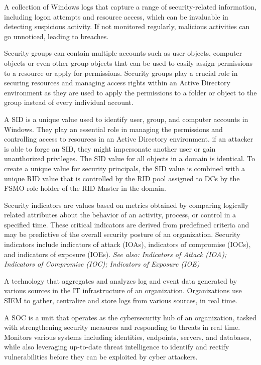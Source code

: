  A collection of Windows logs that capture a range of security-related information, including logon attempts and resource access, which can be invaluable in detecting suspicious activity. If not monitored regularly, malicious activities can go unnoticed, leading to breaches.

 Security groups can contain multiple accounts such as user objects, computer objects or even other group objects that can be used to easily assign permissions to a resource or apply for permissions. Security groups play a crucial role in securing resources and managing access rights within an Active Directory environment as they are used to apply the permissions to a folder or object to the group instead of every individual account.

 A SID is a unique value used to identify user, group, and computer accounts in Windows. They play an essential role in managing the permissions and controlling access to resources in an Active Directory environment. if an attacker is able to forge an SID, they might impersonate another user or gain unauthorized privileges. The SID value for all objects in a domain is identical. To create a unique value for security principals, the SID value is combined with a unique RID value that is controlled by the RID pool assigned to DCs by the FSMO role holder of the RID Master in the domain.

 Security indicators are values based on metrics obtained by comparing logically related attributes about the behavior of an activity, process, or control in a specified time. These critical indicators are derived from predefined criteria and may be predictive of the overall security posture of an organization. Security indicators include indicators of attack (IOAs), indicators of compromise (IOCs), and indicators of exposure (IOEs).
\textit{See also: Indicators of Attack (IOA); Indicators of Compromise (IOC); Indicators of Exposure (IOE)}

 A technology that aggregates and analyzes log and event data generated by various sources in the IT infrastructure of an organization. Organizations use SIEM to gather, centralize and store logs from various sources, in real time.

 A SOC is a unit that operates as the cybersecurity hub of an organization, tasked with strengthening security measures and responding to threats in real time. Monitors various systems including identities, endpoints, servers, and databases, while also leveraging up-to-date threat intelligence to identify and rectify vulnerabilities before they can be exploited by cyber attackers.

